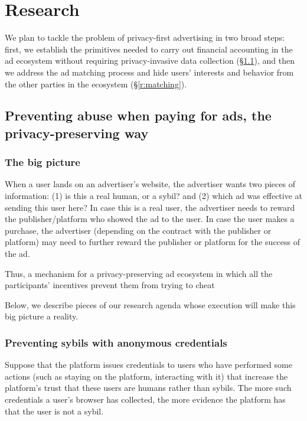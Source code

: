 \section{Research}
\label{r:stuff}

%
We plan to tackle the problem of privacy-first advertising in two broad steps:
first, we establish the primitives needed to carry out financial accounting in
the ad ecosystem without requiring privacy-invasive data
collection (\S\ref{r:fraud}), and then we address the ad matching process and
hide users' interests and behavior from the other parties in the ecosystem
(\S\ref{r:matching}).
%

\subsection{Preventing abuse when paying for ads, the privacy-preserving way}
\label{r:fraud}

\subsubsection{The big picture}
When a user lands on an advertiser's website, the advertiser wants two pieces of information: (1) is this a real human, or a sybil? and (2) which ad was effective at sending this user here?  In case this is a real user, the advertiser needs to reward the publisher/platform who showed the ad to the user.  In case the user makes a purchase, the advertiser (depending on the contract with the publisher or platform) may need to further reward the publisher or platform for the success of the ad.  

Thus, a mechanism for a privacy-preserving ad ecosystem in which all the participants' incentives prevent them from trying to cheat 

Below, we describe pieces of our research agenda whose execution will make this big picture a reality.


\subsubsection{Preventing sybils with anonymous credentials} 
%
Suppose that the platform issues credentials to users who have performed some actions (such as staying on the platform, interacting with it) that increase the platform's trust that these users are humans rather than sybils.  
%
The more such credentials a user's browser has collected, the more evidence the platform has that the user is not a sybil.  

